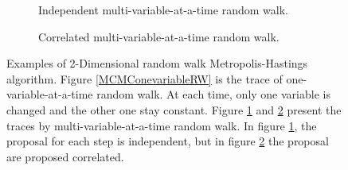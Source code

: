 \begin{figure}[h]
\begin{subfigure}[b]{0.32\textwidth}
    \caption{\footnotesize Independent multi-variable-at-a-time random walk.}\label{MCMCMultivariableRW}
\end{subfigure}
\begin{subfigure}[b]{0.32\textwidth}
  \caption{\footnotesize Correlated multi-variable-at-a-time random walk.}\label{MCMCCorrelatedRW}
\end{subfigure}
\caption{Examples of 2-Dimensional random walk Metropolis-Hastings algorithm. Figure \ref{MCMConevariableRW} is the trace of one-variable-at-a-time random walk. At each time, only one variable is changed and the other one stay constant. Figure \ref{MCMCMultivariableRW} and \ref{MCMCCorrelatedRW} present the traces by multi-variable-at-a-time random walk. In figure \ref{MCMCMultivariableRW}, the proposal for each step is independent, but in figure \ref{MCMCCorrelatedRW} the proposal are proposed correlated.}
\label{randomwalk}
\end{figure}

